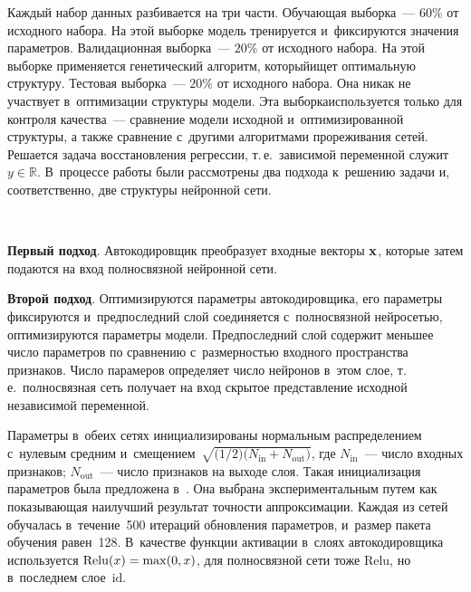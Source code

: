 \begin{multicols}{2}
Каждый набор данных разбивается на три час\-ти. Обучающая выборка~--- $60\%$ от 
исходного набора.\linebreak
 На этой выборке модель тренируется и~фиксируются значения 
параметров. Валидационная выборка~--- $20\%$ от исходного набора. На этой 
выборке применяется генетический алгоритм, который\linebreak ищет оптимальную 
структуру. Тестовая выборка~--- $20\%$ от исходного набора. Она никак не 
участвует в~оптимизации структуры модели. Эта выборка\linebreak используется только для 
контроля качества~--- сравнение модели исходной и~оптимизированной структуры, 
а также сравнение с~другими алгоритмами прореживания сетей.
Решается задача восстановления регрессии, т.\,е.\ зависимой переменной 
служит~$y\in\mathbb{R}$. В~процессе работы были рассмотрены два подхода 
к~решению задачи и, соответственно, две структуры нейронной сети.

\begin{figure*} %
\vspace*{1pt}
    \begin{center}  
  \mbox{%
 \epsfxsize=160.143mm 
 }
\end{center}
\vspace*{-11pt}
\label{fig:disp}
\vspace*{3pt}
\end{figure*}



\textbf{Первый подход}. Автокодировщик преобразует входные векторы ${\mathbf{x}}$, 
которые затем подаются на вход полносвязной нейронной сети.

\textbf{Второй подход}.
Оптимизируются параметры автокодировщика, его параметры фиксируются 
и~предпоследний слой соединяется с~полносвязной нейросетью, оптимизируются 
параметры модели. Предпоследний слой содержит меньшее число параметров по 
сравнению с~размерностью входного пространства признаков. Число парамеров 
определяет число нейронов в~этом слое, т.\,е.\ полносвязная сеть получает на 
вход скрытое представление исходной независимой переменной.

Параметры в~обеих сетях инициализированы нормальным распределением с~нулевым 
средним и~смещением~$\sqrt{({1}/{2)}({N_{\mathrm{in}}+N_{\mathrm{out}})}}$, 
где $N_{\mathrm{in}}$~--- чис\-ло входных признаков; $N_{\mathrm{out}}$~--- 
число признаков на выходе слоя. Такая инициализация параметров была 
предложена в~\cite{fifth}. Она выбрана экспериментальным путем как 
показывающая наилучший результат точности аппроксимации. Каждая из сетей 
обучалась в~течение~500 итераций обновления параметров, и~размер пакета 
обучения равен~128.  В~качестве функции активации в~слоях автокодировщика 
используется $\mathrm{Relu}(x) \hm= \max(0,x)$, для полносвязной сети тоже 
$\mathrm{Relu}$, но в~последнем слое~$\mathrm{id}$.


\end{multicols}
